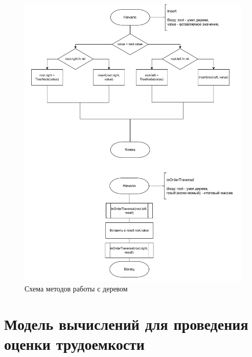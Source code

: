 \begin{figure}[h]
	\centering
	\includegraphics[width=1\linewidth]{img/tree.pdf}
	\caption{Схема методов работы с деревом}
	\label{img:tree}
\end{figure}
\clearpage

\section{Модель вычислений для проведения оценки трудоемкости}

